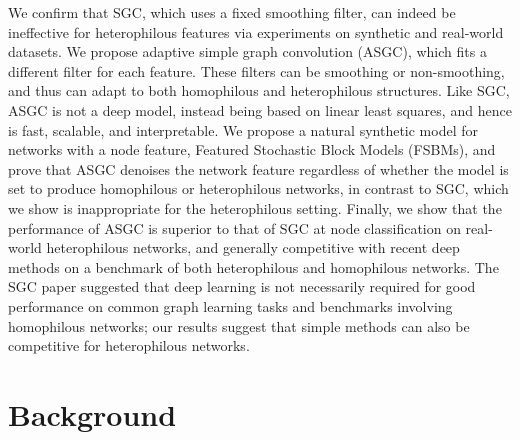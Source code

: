 \documentclass{article}
\newcommand{\Dan}[1]{\textcolor{cyan}{Dan: #1}}
\newcommand{\Cam}[1]{\textcolor{blue}{Cam: #1}}
\begin{document}
We confirm that SGC, which uses a fixed smoothing filter, can indeed be ineffective for heterophilous features via experiments on synthetic and real-world datasets. We propose adaptive simple graph convolution (ASGC), which fits a different filter for each feature. These filters can be smoothing or non-smoothing, and thus can adapt to both homophilous and heterophilous structures. Like SGC, ASGC is not a deep model, instead being based on linear least squares, and hence is fast, scalable, and interpretable. 
We propose a natural synthetic model for networks with a node feature, Featured Stochastic Block Models (FSBMs), and prove that ASGC denoises the network feature regardless of whether the model is set to produce homophilous or heterophilous networks, in contrast to SGC, which we show is inappropriate for the heterophilous setting.
Finally, we show that the performance of ASGC is superior to that of SGC at node classification on real-world heterophilous networks, and generally competitive with recent deep methods on a benchmark of both heterophilous and homophilous networks.
The SGC paper suggested that deep learning is not necessarily required for good performance on common graph learning tasks and benchmarks involving homophilous networks; our results suggest that simple methods can also be competitive for heterophilous networks.



\section{Background}
\end{document}
